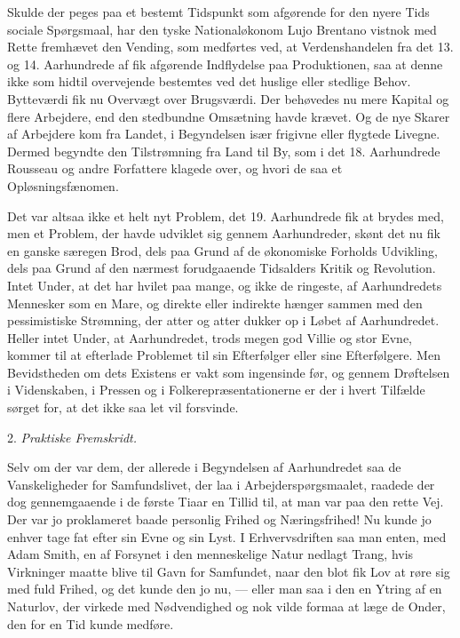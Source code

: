\documentclass[12pt,a4paper,openany]{book}
\newcommand{\opage}[1]{\marginnote{\footnotesize\textit{[#1]}}}
\newcommand{\sectionhead}[2]{\par\bigskip\phantomsection\begin{center}#1 \textit{#2}\end{center}\addcontentsline{toc}{section}{#1 #2}\medskip\ignorespaces}
\begin{document}
Skulde der peges paa et bestemt Tidspunkt som afgørende for den
nyere Tids sociale Spørgsmaal, har den tyske Nationaløkonom Lujo
Brentano vistnok med Rette fremhævet den Vending, som medførtes
ved, at Verdenshandelen fra det 13. og 14. Aarhundrede af fik afgørende
Indflydelse paa Produktionen, saa at denne ikke som hidtil
overvejende bestemtes ved det huslige eller stedlige Behov. Bytteværdi
fik nu Overvægt over Brugsværdi. Der behøvedes nu mere
Kapital og flere Arbejdere, end den stedbundne Omsætning havde
krævet. Og de nye Skarer af Arbejdere kom fra Landet, i Begyndelsen
især frigivne eller flygtede Livegne. Dermed begyndte den Tilstrømning
fra Land til By, som i det 18. Aarhundrede Rousseau og
andre Forfattere klagede over, og hvori de saa et Opløsningsfænomen.

Det var altsaa ikke et helt nyt Problem, det 19. Aarhundrede fik
at brydes med, men et Problem, der havde udviklet sig gennem Aarhundreder,
skønt det nu fik en ganske særegen Brod, dels paa Grund
af de økonomiske Forholds Udvikling, dels paa Grund af den nærmest
forudgaaende Tidsalders Kritik og Revolution. Intet Under, at
det har hvilet paa mange, og ikke de ringeste, af Aarhundredets
Mennesker som en Mare, og direkte eller indirekte hænger sammen
med den pessimistiske Strømning, der atter og atter dukker op i
Løbet af Aarhundredet. Heller intet Under, at Aarhundredet, trods
megen god Villie og stor Evne, kommer til at efterlade Problemet
\opage{89}til sin Efterfølger eller sine Efterfølgere. Men Bevidstheden om dets
Existens er vakt som ingensinde før, og gennem Drøftelsen i Videnskaben,
i Pressen og i Folkerepræsentationerne er der i hvert Tilfælde
sørget for, at det ikke saa let vil forsvinde.

\sectionhead{2.}{Praktiske Fremskridt.}

Selv om der var dem, der allerede i Begyndelsen af Aarhundredet
saa de Vanskeligheder for Samfundslivet, der laa i Arbejderspørgsmaalet,
raadede der dog gennemgaaende i de første Tiaar en Tillid
til, at man var paa den rette Vej. Der var jo proklameret baade personlig
Frihed og Næringsfrihed! Nu kunde jo enhver tage fat efter
sin Evne og sin Lyst. I Erhvervsdriften saa man enten, med Adam
Smith, en af Forsynet i den menneskelige Natur nedlagt Trang, hvis
Virkninger maatte blive til Gavn for Samfundet, naar den blot fik
Lov at røre sig med fuld Frihed, og det kunde den jo nu, --- eller
man saa i den en Ytring af en Naturlov, der virkede med Nødvendighed
og nok vilde formaa at læge de Onder, den for en Tid kunde
medføre.
\end{document}
